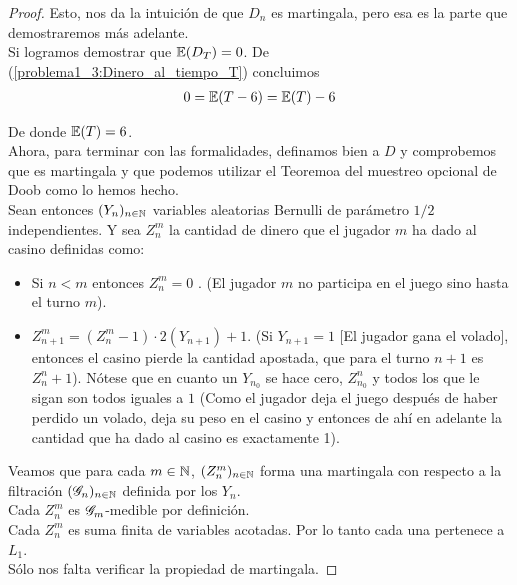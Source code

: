\begin{proof}
		Esto, nos da la intuición de que $D_n$ es martingala, pero esa es la parte que demostraremos más adelante.\\
	   
		Si logramos demostrar que $\mathbb{E}(D_T) = 0$. De (\ref{problema1_3:Dinero_al_tiempo_T}) concluimos
		\begin{align}
			0 = \mathbb{E}(T - 6) = \mathbb{E}(T) - 6
		\end{align}
		
		De donde $\mathbb{E}(T) = 6$.\\
		
		Ahora, para terminar con las formalidades, definamos bien a $D$ y comprobemos que es martingala y 
		que podemos utilizar el Teoremoa del muestreo opcional de Doob como lo hemos hecho.\\
		
		Sean entonces $(Y_n)_{n \in \mathbb{N}}$ variables aleatorias Bernulli de parámetro $1/2$ independientes.
		Y sea $Z_n^m$ la cantidad de dinero que el jugador $m$ ha dado al casino definidas como:
		
		\begin{itemize}
			\item 
				Si $n < m$ entonces $Z_n^m = 0$ . (El jugador $m$ no participa en el juego sino hasta el turno $m$).
			\item
				$Z_{n+1}^{m} = (Z_n^{m} - 1) \cdot 2(Y_{n+1}) + 1$. (Si $Y_{n + 1} = 1$ [El jugador gana el volado], entonces el casino
				pierde la cantidad apostada, que para el turno $n+1$ es $Z_n^n + 1$). Nótese que en cuanto un $Y_{n_0}$ se hace cero,
				$Z_{n_0}^{n}$ y todos los que le sigan son todos iguales a $1$ (Como el jugador deja el juego después de haber perdido
				un volado, deja su peso en el casino y entonces de ahí en adelante la cantidad que ha dado al casino es exactamente 1).
		\end{itemize}
		
		Veamos que para cada $m \in \mathbb{N}$, $(Z_n^m)_{n \in \mathbb{N}}$ forma una martingala con respecto a la filtración $(\mathscr{G}_n)_{n \in \mathbb{N}}$ 
		definida por los $Y_n$.\\
		
		Cada $Z_n^m$ es $\mathscr{G}_m$-medible por definición.\\
		
		Cada $Z_n^m$ es suma finita de variables acotadas. Por lo tanto cada una pertenece a $L_1$.\\
		
		Sólo nos falta verificar la propiedad de martingala.
		

\end{proof}
